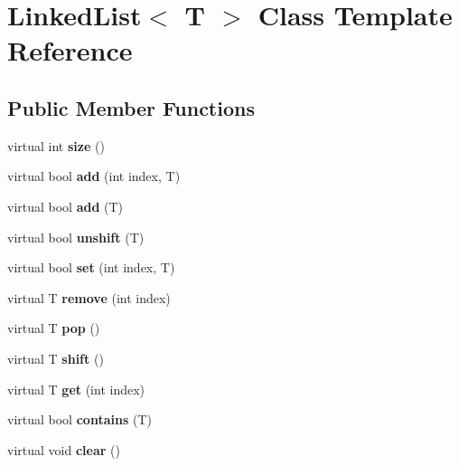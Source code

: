 \hypertarget{classLinkedList}{\section{Linked\-List$<$ T $>$ Class Template Reference}
\label{classLinkedList}
}
\subsection*{Public Member Functions}
\begin{DoxyCompactItemize}
\item 
\hypertarget{classLinkedList_ab8388ea027c2de8125f5d1e5901c2b2e}{virtual int {\bfseries size} ()}\label{classLinkedList_ab8388ea027c2de8125f5d1e5901c2b2e}

\item 
\hypertarget{classLinkedList_a3307f9b9ecf90a18c270b3b6bc7a7e04}{virtual bool {\bfseries add} (int index, T)}\label{classLinkedList_a3307f9b9ecf90a18c270b3b6bc7a7e04}

\item 
\hypertarget{classLinkedList_a9c3c4f3f527bde2e1572a43f3fb26ea3}{virtual bool {\bfseries add} (T)}\label{classLinkedList_a9c3c4f3f527bde2e1572a43f3fb26ea3}

\item 
\hypertarget{classLinkedList_a55ba7f61737011f2b684d59154543e6e}{virtual bool {\bfseries unshift} (T)}\label{classLinkedList_a55ba7f61737011f2b684d59154543e6e}

\item 
\hypertarget{classLinkedList_a08ce5b6527cefbd221324569fdb10969}{virtual bool {\bfseries set} (int index, T)}\label{classLinkedList_a08ce5b6527cefbd221324569fdb10969}

\item 
\hypertarget{classLinkedList_af331637727b3ada2f806c29b9f4cc6fe}{virtual T {\bfseries remove} (int index)}\label{classLinkedList_af331637727b3ada2f806c29b9f4cc6fe}

\item 
\hypertarget{classLinkedList_a00a70f924d76dcbfa3b05503caad40e6}{virtual T {\bfseries pop} ()}\label{classLinkedList_a00a70f924d76dcbfa3b05503caad40e6}

\item 
\hypertarget{classLinkedList_aaf7239844a9d745b6dd11249ff4990c8}{virtual T {\bfseries shift} ()}\label{classLinkedList_aaf7239844a9d745b6dd11249ff4990c8}

\item 
\hypertarget{classLinkedList_a25079ed9b408efad63a1522c818d8705}{virtual T {\bfseries get} (int index)}\label{classLinkedList_a25079ed9b408efad63a1522c818d8705}

\item 
\hypertarget{classLinkedList_af1de9b03ff401cae0a842680b77d32c2}{virtual bool {\bfseries contains} (T)}\label{classLinkedList_af1de9b03ff401cae0a842680b77d32c2}

\item 
\hypertarget{classLinkedList_a50c26292740c964ac7bef0e072868be1}{virtual void {\bfseries clear} ()}\label{classLinkedList_a50c26292740c964ac7bef0e072868be1}

\end{DoxyCompactItemize}
